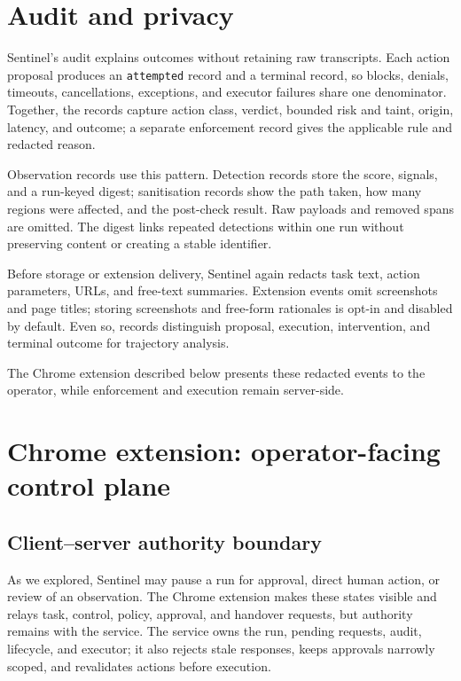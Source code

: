 \section{Audit and privacy}

Sentinel's audit explains outcomes without retaining raw transcripts. Each
action proposal produces an \texttt{attempted} record and a terminal record, so
blocks, denials, timeouts, cancellations, exceptions, and executor failures
share one denominator. Together, the records capture action class, verdict,
bounded risk and taint, origin, latency, and outcome; a separate enforcement
record gives the applicable rule and redacted reason.

Observation records use this pattern. Detection records store the score,
signals, and a run-keyed digest; sanitisation records show the path taken, how
many regions were affected, and the post-check result. Raw payloads and removed
spans are omitted. The digest links repeated detections within one run without
preserving content or creating a stable identifier.

Before storage or extension delivery, Sentinel again redacts task text, action
parameters, URLs, and free-text summaries. Extension events omit screenshots
and page titles; storing screenshots and free-form rationales is opt-in and
disabled by default. Even so, records distinguish proposal, execution,
intervention, and terminal outcome for trajectory analysis.

The Chrome extension described below presents these redacted events to the
operator, while enforcement and execution remain server-side.

\section{Chrome extension: operator-facing control plane}
\label{sec:control-plane}

\subsection{Client--server authority boundary}

As we explored, Sentinel may pause a run for approval, direct human action, or review of an
observation. The Chrome extension makes these states visible and relays task,
control, policy, approval, and handover requests, but authority remains with the
service. The service owns the run, pending requests, audit, lifecycle, and
executor; it also rejects stale responses, keeps approvals narrowly scoped, and
revalidates actions before execution.

